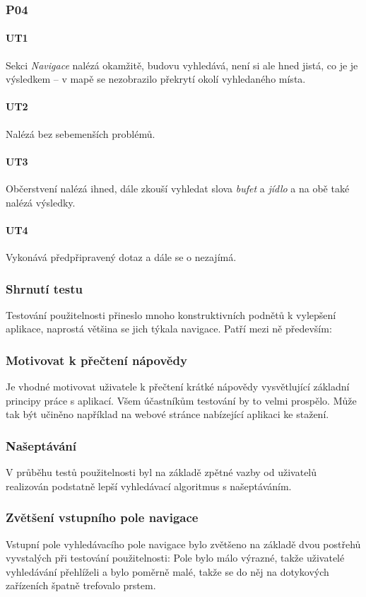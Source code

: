 \subsubsection*{P04}
\paragraph*{UT1}
Sekci \textit{Navigace} nalézá okamžitě, budovu vyhledává, není si ale hned jistá, co je je výsledkem -- v mapě se nezobrazilo překrytí okolí vyhledaného místa. 
\paragraph*{UT2}
Nalézá bez sebemenších problémů.
\paragraph*{UT3}
Občerstvení nalézá ihned, dále zkouší vyhledat slova \textit{bufet} a \textit{jídlo} a na obě také nalézá výsledky.
\paragraph*{UT4}
Vykonává předpřipravený dotaz a dále se o  nezajímá.

\subsubsection{Shrnutí testu}
Testování použitelnosti přineslo mnoho konstruktivních podnětů k vylepšení aplikace, naprostá většina se jich týkala navigace. Patří mezi ně především:
\subsubsection*{Motivovat k přečtení nápovědy}
Je vhodné motivovat uživatele k přečtení krátké nápovědy vysvětlující základní principy práce s aplikací. Všem účastníkům testování by to velmi prospělo. Může tak být učiněno například na webové stránce nabízející aplikaci ke stažení.
\subsubsection*{Našeptávání}
V průběhu testů použitelnosti byl na základě zpětné vazby od uživatelů realizován podstatně lepší vyhledávací algoritmus s našeptáváním.
\subsubsection*{Zvětšení vstupního pole navigace}
Vstupní pole vyhledávacího pole navigace bylo zvětšeno na základě dvou postřehů vyvstalých při testování použitelnosti: Pole bylo málo výrazné, takže uživatelé vyhledávání přehlíželi a bylo poměrně malé, takže se do něj na dotykových zařízeních špatně trefovalo prstem.
